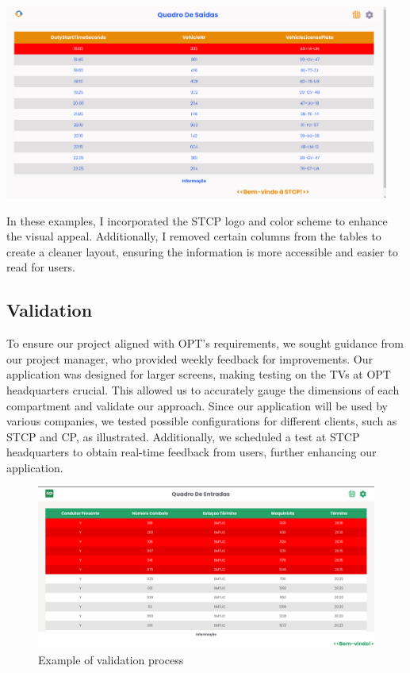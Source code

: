 \documentclass[10pt]{article}
\begin{document}
        \vfill
        \includegraphics[width=0.95\textwidth]{table_of_exits_stcp2}
        \vfill


        In these examples, I incorporated the STCP logo and color scheme to enhance the visual appeal. 
        Additionally, I removed certain columns from the tables to create a cleaner layout, ensuring the information is more accessible and easier to read for users.

        \subsection{Validation}

        To ensure our project aligned with OPT's requirements, we sought guidance from our project manager, who provided weekly feedback for improvements. Our application was designed for larger screens, making testing on the TVs at OPT headquarters crucial. This allowed us to accurately gauge the dimensions of each compartment and validate our approach. Since our application will be used by various companies, we tested possible configurations for different clients, such as STCP and CP, as illustrated. Additionally, we scheduled a test at STCP headquarters to obtain real-time feedback from users, further enhancing our application.

        \begin{figure}[h]
            \centering
            \includegraphics[width=1\textwidth]{validation_eg}
            \caption{Example of validation process}
            \label{fig:validation_example}
        \end{figure}
\end{document}
